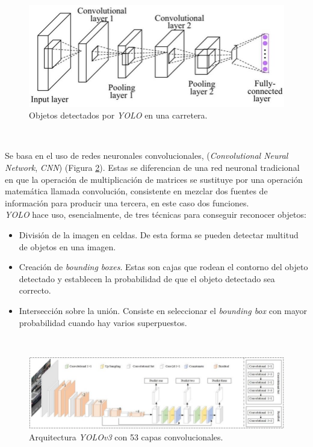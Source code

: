 \begin{figure} [h!]
	\begin{center}
		\includegraphics[width=12cm]{figs/yolo}
	\end{center}
	\caption{Objetos detectados por \textit{YOLO} en una carretera.}
	\label{fig:yolo}
\end{figure}\

Se basa en el uso de redes neuronales convolucionales, (\textit{Convolutional Neural Network}, \textit{CNN}) (Figura \ref{fig:yololayers}). Estas se diferencian de una red neuronal tradicional en que la operación de multiplicación de matrices se sustituye por una operación matemática llamada convolución, consistente en mezclar dos fuentes de información para producir una tercera, en este caso dos funciones.\\

\textit{YOLO} hace uso, esencialmente, de tres técnicas para conseguir reconocer objetos:
\begin{itemize}
	\item División de la imagen en celdas. De esta forma se pueden detectar multitud de objetos en una imagen.
	\item Creación de \textit{bounding boxes}. Estas son cajas que rodean el contorno del objeto detectado y establecen la probabilidad de que el objeto detectado sea correcto.
	\item Intersección sobre la unión. Consiste en seleccionar el \textit{bounding box} con mayor probabilidad cuando hay varios superpuestos.
\end{itemize}\

\begin{figure} [h!]
	\begin{center}
		\includegraphics[width=16cm]{figs/yolov353}
	\end{center}
	\caption{Arquitectura \textit{YOLOv3} con 53 capas convolucionales.}
	\label{fig:yololayers}
\end{figure}\

